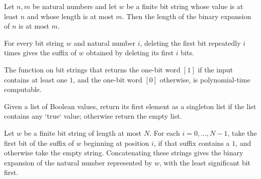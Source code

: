 \begin{theorem}
\label{Complexity.BinArith.length_bits_le_of_le}
\leanok
{}
Let $n,m$ be natural numbers and let $w$ be a finite bit string whose value is at least
$n$ and whose length is at most $m$. Then the length of the binary expansion of $n$ is
at most $m$.
\end{theorem}

\begin{theorem}
\label{Complexity.BinArith.iterate_drop_one}
\leanok
{}
For every bit string $w$ and natural number $i$, deleting the first bit repeatedly $i$
times gives the suffix of $w$ obtained by deleting its first $i$ bits.
\end{theorem}

\begin{theorem}
\label{Complexity.BinArith.polyTimeComputable_any}
\leanok
{}
The function on bit strings that returns the one-bit word $[1]$ if the input contains at
least one $1$, and the one-bit word $[0]$ otherwise, is polynomial-time computable.
\end{theorem}

\begin{definition}
\label{Complexity.BinArith.normChunk}
\leanok
Given a list of Boolean values, return its first element as a singleton list if the list
contains any `true` value; otherwise return the empty list.
\end{definition}

\begin{theorem}
\label{Complexity.BinArith.flatMap_normChunk}
\leanok
{}
Let $w$ be a finite bit string of length at most $N$. For each $i=0,\ldots,N-1$, take
the first bit of the suffix of $w$ beginning at position $i$, if that suffix contains a
$1$, and otherwise take the empty string. Concatenating these strings gives the binary
expansion of the natural number represented by $w$, with the least significant bit
first.
\end{theorem}

